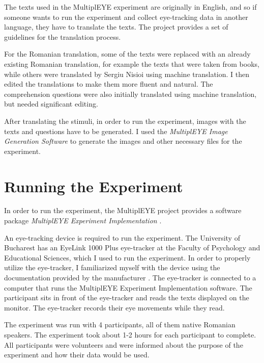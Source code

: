 The texts used in the MultiplEYE experiment are originally in English, and so if someone wants to run the experiment and collect eye-tracking data in another language, they have to translate the texts. The project provides a set of guidelines for the translation process. 

For the Romanian translation, some of the texts were replaced with an already existing Romanian translation, for example the texts that were taken from books, while others were translated by Sergiu Nisioi using machine translation. I then edited the translations to make them more fluent and natural. The comprehension questions were also initially translated using machine translation, but needed significant editing.

After translating the stimuli, in order to run the experiment, images with the texts and questions have to be generated. I used the \textit{MultiplEYE Image Generation Software} \cite{Jakobi2025_MultiplEYE} to generate the images and other necessary files for the experiment.

\section{Running the Experiment}
In order to run the experiment, the MultiplEYE project provides a software package \textit{MultiplEYE Experiment Implementation} \cite{MultiplEYE_ExperimentImplementation2025}. 

An eye-tracking device is required to run the experiment. The University of Bucharest has an EyeLink 1000 Plus eye-tracker at the Faculty of Psychology and Educational Sciences, which I used to run the experiment. In order to properly utilize the eye-tracker, I familiarized myself with the device using the documentation provided by the manufacturer \cite{EyeLink1000PlusUserManual}. The eye-tracker is connected to a computer that runs the MultiplEYE Experiment Implementation software. The participant sits in front of the eye-tracker and reads the texts displayed on the monitor. The eye-tracker records their eye movements while they read.

The experiment was run with 4 participants, all of them native Romanian speakers. The experiment took about 1-2 hours for each participant to complete. All participants were volunteers and were informed about the purpose of the experiment and how their data would be used. 


